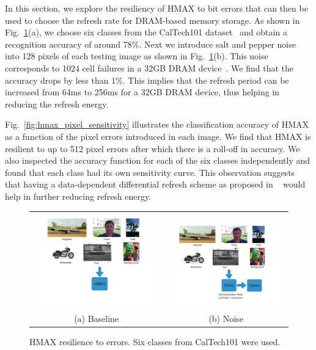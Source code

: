 In this section, we explore the resiliency of HMAX to bit errors that can then be used to choose the refresh rate for DRAM-based memory storage.  
As shown in Fig.~\ref{tab:hmax_reliability}(a), we choose six classes from the CalTech101 dataset~\cite{Fergus2004} 
and obtain a recognition accuracy of around 78\%. Next we introduce salt and pepper noise into 128 pixels of each testing image 
as shown in Fig.~\ref{tab:hmax_reliability}(b). This noise corresponds to 1024 cell failures in a 32GB DRAM device~\cite{Liu2012}. 
We find that the accuracy drops by less than 1\%. 
This implies that the refresh period can be increased from 64ms to 256ms for a 32GB DRAM device, thus helping in 
reducing the refresh energy.

Fig.~\ref{fig:hmax_pixel_sensitivity} illustrates the classification accuracy of HMAX as a 
function of the pixel errors introduced in each image.
We find that HMAX is resilient to up to 512 pixel errors after which there is a roll-off in accuracy. 
We also inspected the accuracy function for each of the six classes independently and found that each class had its own sensitivity curve. This observation suggests 
that having a data-dependent differential refresh scheme as proposed in ~\cite{iccd2014} would help in further reducing refresh energy.

\begin{figure}[!htb]
\centering
\begin{tabular}{@{}c@{} @{}c@{}}
\includegraphics[width=0.45\linewidth]{./figures/hmax_reliability_a.png} & \includegraphics[width=0.45\linewidth]{./figures/hmax_reliability_b.png}\\[\abovecaptionskip]
\small (a) Baseline & \small (b) Noise
\end{tabular}
\vspace{1pt}
\caption{HMAX resilience to errors. Six classes from CalTech101 were used.}
\label{tab:hmax_reliability}
\end{figure}

